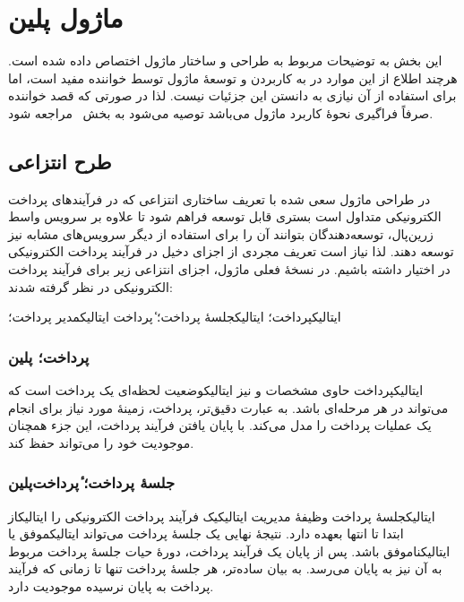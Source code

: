 \section{ماژول ‌پلین{}}
\label{بخش:ماژول}

این بخش به توضیحات مربوط به طراحی و ساختار
ماژول  اختصاص داده شده است. هرچند اطلاع
از این موارد در به کاربردن و توسعهٔ ماژول توسط
خواننده مفید است، اما برای استفاده از آن نیازی به
دانستن این جزئیات نیست. لذا در صورتی که قصد
خواننده صرفاً فراگیری نحوهٔ کاربرد ماژول می‌باشد
توصیه می‌شود به بخش~ مراجعه شود.

\subsection{طرح انتزاعی}
در طراحی ماژول سعی شده با تعریف ساختاری
انتزاعی که در
فرآیندهای پرداخت الکترونیکی متداول است
بستری قابل توسعه فراهم شود تا علاوه بر سرویس واسط
زرین‌پال، توسعه‌دهندگان بتوانند آن را برای 
استفاده از دیگر سرویس‌های مشابه نیز توسعه دهند.
لذا نیاز است تعریف مجردی از اجزای دخیل در
فرآیند پرداخت الکترونیکی در اختیار داشته باشیم.
در نسخهٔ فعلی ماژول، اجزای انتزاعی زیر برای فرآیند 
پرداخت الکترونیکی در نظر گرفته شدند:
\begin{itemize}
	 ‌ایتالیک{پرداخت}؛ 
	 ‌ایتالیک{جلسهٔ پرداخت}؛ ٔ‌پرداخت{}
	 ‌ایتالیک{مدیر پرداخت}؛ 
\end{itemize}


\subsubsection{پرداخت؛ ‌پلین{}}
‌ایتالیک{پرداخت} حاوی مشخصات و نیز
‌ایتالیک{وضعیت لحظه‌ای} یک پرداخت
است که می‌تواند در هر مرحله‌ای باشد.
به عبارت دقیق‌تر، پرداخت، زمینهٔ
مورد نیاز برای انجام یک عملیات پرداخت
را مدل می‌کند. با پایان یافتن فرآیند پرداخت،
این جزء همچنان موجودیت خود را می‌تواند حفظ کند. 

\subsubsection{جلسهٔ پرداخت؛ ٔ‌پرداخت‌پلین{}}
‌ایتالیک{جلسهٔ پرداخت} وظیفهٔ مدیریت
‌ایتالیک{یک} فرآیند پرداخت الکترونیکی را
‌ایتالیک{از ابتدا تا انتها} بعهده دارد.
نتیجهٔ نهایی یک جلسهٔ پرداخت می‌تواند
‌ایتالیک{موفق} یا ‌ایتالیک{ناموفق} باشد. 
پس از پایان یک فرآیند پرداخت، دورهٔ حیات
جلسهٔ پرداخت مربوط به آن نیز به پایان می‌رسد.
به بیان ساده‌تر، هر جلسهٔ پرداخت تنها تا زمانی
که فرآیند پرداخت به پایان نرسیده موجودیت دارد.

